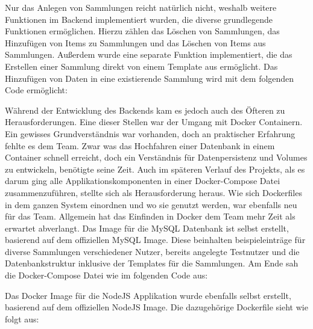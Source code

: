 Nur das Anlegen von Sammlungen reicht natürlich nicht, weshalb weitere Funktionen im Backend implementiert wurden, die diverse grundlegende Funktionen ermöglichen.
Hierzu zählen das Löschen von Sammlungen, das Hinzufügen von Items zu Sammlungen und das Löschen von Items aus Sammlungen.
Außerdem wurde eine separate Funktion implementiert, die das Erstellen einer Sammlung direkt von einem Template aus ermöglicht.
Das Hinzufügen von Daten in eine existierende Sammlung wird mit dem folgenden Code ermöglicht:

\vspace{1em}

\vspace{1em}

Während der Entwicklung des Backends kam es jedoch auch des Öfteren zu Herausforderungen.
Eine dieser Stellen war der Umgang mit Docker Containern.
Ein gewisses Grundverständnis war vorhanden, doch an praktischer Erfahrung fehlte es dem Team.
Zwar was das Hochfahren einer Datenbank in einem Container schnell erreicht, doch ein Verständnis für Datenpersistenz und Volumes zu entwickeln, benötigte seine Zeit.
Auch im späteren Verlauf des Projekts, als es darum ging alle Applikationskomponenten in einer Docker-Compose Datei zusammenzuführen, stellte sich als Herausforderung heraus.
Wie sich Dockerfiles in dem ganzen System einordnen und wo sie genutzt werden, war ebenfalls neu für das Team.
Allgemein hat das Einfinden in Docker dem Team mehr Zeit als erwartet abverlangt.
Das Image für die MySQL Datenbank ist selbst erstellt, basierend auf dem offiziellen MySQL Image.
Diese beinhalten beispieleinträge für diverse Sammlungen verschiedener Nutzer, bereits angelegte Testnutzer und die Datenbankstruktur inklusive der Templates für die Sammlungen.
Am Ende sah die Docker-Compose Datei wie im folgenden Code aus:

\vspace{1em}

\vspace{1em}

Das Docker Image für die NodeJS Applikation wurde ebenfalls selbst erstellt, basierend auf dem offiziellen NodeJS Image.
Die dazugehörige Dockerfile sieht wie folgt aus:

\vspace{1em}

\vspace{1em}

